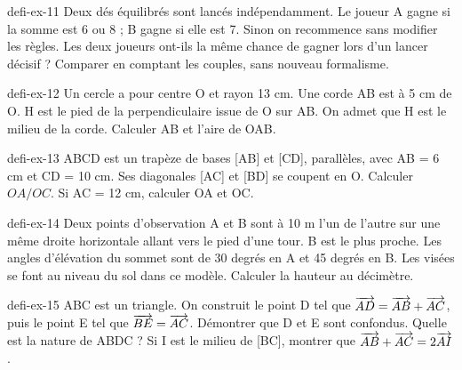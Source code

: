 \begin{blocEdition}{defi-ex-11}
Deux dés équilibrés sont lancés indépendamment. Le joueur A gagne si la somme est 6 ou 8 ; B gagne si elle est 7. Sinon on recommence sans modifier les règles. Les deux joueurs ont-ils la même chance de gagner lors d’un lancer décisif ? Comparer en comptant les couples, sans nouveau formalisme.
\end{blocEdition}
\begin{blocEdition}{defi-ex-12}
Un cercle a pour centre O et rayon 13 cm. Une corde AB est à 5 cm de O. H est le pied de la perpendiculaire issue de O sur AB. On admet que H est le milieu de la corde. Calculer AB et l’aire de OAB.\label{fig-defi-12}

\end{blocEdition}
\begin{blocEdition}{defi-ex-13}
ABCD est un trapèze de bases [AB] et [CD], parallèles, avec AB = 6 cm et CD = 10 cm. Ses diagonales [AC] et [BD] se coupent en O. Calculer $OA/OC$. Si AC = 12 cm, calculer OA et OC.\label{fig-defi-13}

\end{blocEdition}
\begin{blocEdition}{defi-ex-14}
Deux points d’observation A et B sont à 10 m l’un de l’autre sur une même droite horizontale allant vers le pied d’une tour. B est le plus proche. Les angles d’élévation du sommet sont de 30 degrés en A et 45 degrés en B. Les visées se font au niveau du sol dans ce modèle. Calculer la hauteur au décimètre.\label{fig-defi-14}

\end{blocEdition}
\begin{blocEdition}{defi-ex-15}
ABC est un triangle. On construit le point D tel que $\overrightarrow{AD}=\overrightarrow{AB}+\overrightarrow{AC}$, puis le point E tel que $\overrightarrow{BE}=\overrightarrow{AC}$. Démontrer que D et E sont confondus. Quelle est la nature de ABDC ? Si I est le milieu de [BC], montrer que $\overrightarrow{AB}+\overrightarrow{AC}=2\overrightarrow{AI}$.\label{fig-defi-15}

\end{blocEdition}
